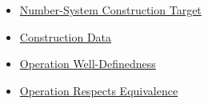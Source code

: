\begin{dependencies}
\begin{itemize}
  \item \hyperref[def:number-system-construction-target]{Number-System Construction Target}
  \item \hyperref[def:number-system-construction-data]{Construction Data}
  \item \hyperref[def:operation-well-definedness]{Operation Well-Definedness}
  \item \hyperref[def:operation-respects-equivalence]{Operation Respects Equivalence}
\end{itemize}
\end{dependencies}
